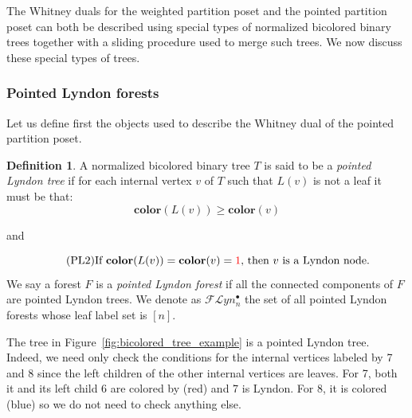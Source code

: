 \documentclass[11pt]{article}
\theoremstyle{definition}
\newtheorem{defi}[theo]{Definition}
\numberwithin{equation}{section}
\newcommand{\Flyn}{\mathcal{FL}yn}
\newcommand{\clr}{\mathbf{color}}
\newcommand{\tre}[1]{{\color{red}{#1}}}
\newcommand{\tbl}[1]{{\color{blue}{#1}}}
\begin{document}
The Whitney duals for the weighted partition poset and the pointed partition poset can both   be described using special types of normalized bicolored binary trees together with a sliding procedure used to merge   such trees.   We now discuss these special types of trees.


\subsubsection{Pointed Lyndon forests}

Let us define first the objects used to describe the Whitney dual of the pointed partition poset.

\begin{defi}
A normalized bicolored binary tree $T$ is said to be a \emph{pointed Lyndon tree} if for each internal vertex $v$ of $T$ such that $L(v)$ is not a leaf it must be that:
\begin{equation}\label{condition:pointed_lyndon_1}\tag{PL1}
\clr(L(v))\geq \clr(v)
\end{equation}
\begin{center} and \end{center}
\begin{equation}\label{condition:pointed_lyndon_2}\tag{PL2}
      \text{If } \clr(L(v))=\clr(v)=\tre{1}\text{, then $v$ is a Lyndon node.}
\end{equation}
 We say a forest $F$ is a \emph{pointed Lyndon forest} if  all the connected components of $F$ are pointed Lyndon trees.  We denote as   $\Flyn_{n}^{\bullet}$ the set of all pointed Lyndon forests whose leaf label set is $[n]$.   
\end{defi}

The tree in Figure~\ref{fig:bicolored_tree_example} is a pointed Lyndon tree. Indeed, we need only check the conditions for the internal vertices labeled by 7 and 8 since the left children of the other internal vertices are leaves.  For 7, both it and its left child 6 are colored by \tre{1} (red) and 7 is Lyndon. For 8, it is colored \tbl{0} (blue) so we do not need to check anything else.  
\end{document}
